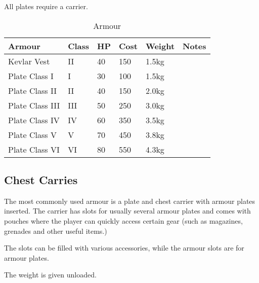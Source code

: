 All plates require a carrier.

\begin{table}
  \caption{Armour}
  \label{tab:Armour}
  \begin{center}
    \begin{tabular}{| l | l | l | l | l | l |}

      \hline
      \textbf{Armour} & \textbf{Class} & \textbf{HP} &
      \textbf{Cost} & \textbf{Weight} & \textbf{Notes} \\ \hline

      Kevlar Vest     &  II & 40 & 150 & 1.5kg & \\ \hline
      Plate Class I   &   I & 30 & 100 & 1.5kg & \\ \hline
      Plate Class II  &  II & 40 & 150 & 2.0kg & \\ \hline
      Plate Class III & III & 50 & 250 & 3.0kg & \\ \hline
      Plate Class IV  &  IV & 60 & 350 & 3.5kg & \\ \hline
      Plate Class V   &   V & 70 & 450 & 3.8kg & \\ \hline
      Plate Class VI  &  VI & 80 & 550 & 4.3kg & \\ \hline

    \end{tabular}
  \end{center}
\end{table}

\subsection{Chest Carries}

The most commonly used armour is a plate and chest carrier with armour plates
inserted. The carrier has slots for usually several armour plates and comes
with pouches where the player can quickly access certain gear (such as
magazines, grenades and other useful items.)

The slots can be filled with various accessories, while the armour slots are
for armour plates.

The weight is given unloaded.

